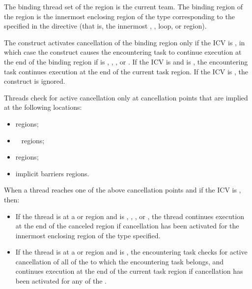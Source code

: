 {{{{\begin{samepage}

\binding
The binding thread set of the  region is the current team.
The binding region of the  region 
is the innermost enclosing region of the type corresponding to the  
specified in the directive (that is, the innermost , , loop, or 
 region).

\descr
The  construct activates cancellation of the binding region only if the  ICV
is , in which case the  construct causes the encountering task to continue execution 
at the end of the binding region if  is , , , or . 
If the  ICV is  and  is , the encountering task continues execution at the end of the current task region.
If the  ICV is , the  construct is 
ignored.

\end{samepage}

Threads check for active cancellation only at cancellation points that are 
implied at the following locations:

\begin{itemize}
\item {} regions;
\item {}~ regions;
\item {} regions;
\item implicit barriers regions.
\end{itemize}

When a thread reaches one of the above cancellation points and if the  ICV is ,  then:
\begin{itemize}
\item If the thread is at a  or  region 
and  is , , , or 
, the thread continues execution at the end of the canceled 
region if cancellation has been activated for the innermost enclosing region 
of the type specified.

\item If the thread is at a  or  region 
and  is , the encountering task 
checks for active cancellation of all of the  to which the 
encountering task belongs, and continues execution at the end of the current 
task region if cancellation has been activated for any of the .


\end{itemize}}}}}
